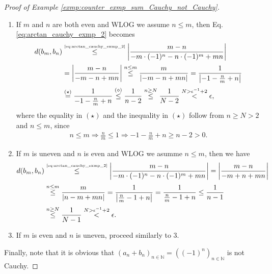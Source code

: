 \documentclass[12pt, a4paper]{article}
\numberwithin{equation}{section}
\theoremstyle{definition}
\theoremstyle{definition}
\newcommand{\abs}[1]{\left\vert #1 \right\vert}
\newcommand{\seq}[1][\varphi]{\left( #1 \right)_{n \in \mathbb{N}}}
\begin{document}
\begin{proof}[Proof of Example \ref{exmp:counter_exmp_sum_Cauchy_not_Cauchy}]
\begin{enumerate}
			\item If $m$ and $n$ are both even and WLOG we assume $n\leq m$, then Eq. \eqref{eq:arctan_cauchy_exmp_2} becomes
			\begin{align*}
				d(b_m, b_n) &\overset{\tiny\eqref{eq:arctan_cauchy_exmp_2}}{\leq} \abs{\frac{m - n}{- m \cdot (-1)^n -n\cdot (-1)^m + mn}}
				\\[2pt] &= \abs{\frac{m - n}{-m-n+mn}} \overset{n\leq m}{\leq} \frac{m}{\abs{-m -n + mn}} = \frac{1}{\abs{-1 -\frac{n}{m} + n}}
				\\[2pt] &\overset{(\star)}{=} \frac{1}{-1-\frac{n}{m} + n} \overset{(\diamond)}{\leq}\frac{1}{n - 2} \overset{n\geq N}{\leq} \frac{1}{N - 2} \overset{N > \epsilon^{-1} + 2}{<} \epsilon,
			\end{align*} 
			where the equality in $(\star)$ and the inequality in $(\star)$ follow from $n\geq N > 2$ and $n\leq m$, since 
			\begin{align*}
				n \leq m \Rightarrow \frac{n}{m} \leq 1\Rightarrow -1- \frac{n}{m} + n\geq n - 2 > 0.
			\end{align*}
		
			\item If $m$ is uneven and $n$ is even and WLOG we asumme $n\leq m$, then we have
			\begin{align*}
				d(b_m, b_n) &\overset{\tiny\eqref{eq:arctan_cauchy_exmp_2}}{\leq} \abs{\frac{m - n}{- m \cdot (-1)^n -n\cdot (-1)^m + mn}} = \abs{\frac{m - n}{-m + n + mn}}
				\\[2pt] &\overset{n\leq m}{\leq} \frac{m}{\abs{n - m + mn}} = \frac{1}{\abs{\frac{n}{m} - 1 + n}} = \frac{1}{\frac{n}{m} - 1 + n} \leq \frac{1}{n - 1}
				\\[2pt] &\overset{n \geq N}{\leq} \frac{1}{N - 1} \overset{N > \epsilon^{-1} + 2}{<} \epsilon.
			\end{align*}
			
			\item If $m$ is even and $n$ is uneven, proceed similarly to 3.
		\end{enumerate}
		Finally, note that it is obvious that $\seq[a_n + b_n] = \seq[(-1)^n]$ is not Cauchy.
	\end{proof}
	
\end{document}
